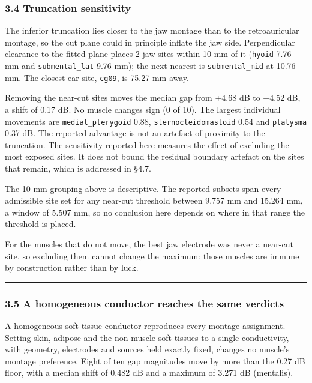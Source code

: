\documentclass[manuscript,review,anonymous]{acmart}
\begin{document}
\subsubsection{3.4 Truncation sensitivity}\label{truncation-sensitivity}

The inferior truncation lies closer to the jaw montage than to the
retroauricular montage, so the cut plane could in principle inflate the jaw
side. Perpendicular clearance to the fitted plane places 2 jaw sites within
10 mm of it (\texttt{hyoid} 7.76 mm and \texttt{submental\_lat} 9.76 mm); the next nearest is
\texttt{submental\_mid} at 10.76 mm. The closest ear site, \texttt{cg09}, is 75.27 mm away.

Removing the near-cut sites moves the median gap from +4.68 dB to +4.52 dB, a
shift of \textminus{}0.17 dB. No muscle changes sign (0 of 10). The largest individual
movements are \texttt{medial\_pterygoid} \textminus{}0.88, \texttt{sternocleidomastoid} \textminus{}0.54 and
\texttt{platysma} \textminus{}0.37 dB. The reported advantage is not an artefact of proximity to
the truncation. The sensitivity reported here measures the effect of excluding
the most exposed sites. It does not bound the residual boundary artefact on the
sites that remain, which is addressed in \S{}4.7.

The 10 mm grouping above is descriptive. The reported subsets span every
admissible site set for any near-cut threshold between 9.757 mm and 15.264 mm, a
window of 5.507 mm, so no conclusion here depends on where in that range the
threshold is placed.

For the muscles that do not move, the best jaw electrode was never a near-cut
site, so excluding them cannot change the maximum: those muscles are immune by
construction rather than by luck.

\begin{center}\rule{0.5\linewidth}{0.5pt}\end{center}

\subsubsection{3.5 A homogeneous conductor reaches the same verdicts}\label{a-homogeneous-conductor-reaches-the-same-verdicts}

A homogeneous soft-tissue conductor reproduces every montage assignment.
Setting skin, adipose and the non-muscle soft tissues to a single conductivity,
with geometry, electrodes and sources held exactly fixed, changes no muscle's
montage preference. Eight of ten gap magnitudes move by more than the 0.27 dB
floor, with a median shift of 0.482 dB and a maximum of 3.271 dB (mentalis).
\end{document}

